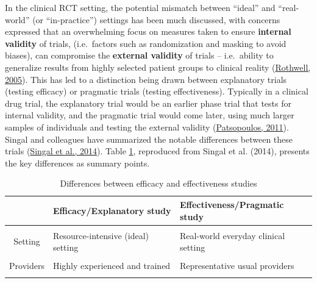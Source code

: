 \documentclass{krantz}
\begin{document}
In the clinical RCT setting, the potential mismatch between ``ideal'' and ``real-world'' (or ``in-practice'') settings has been much discussed, with concerns expressed that an overwhelming focus on measures taken to ensure \textbf{internal validity} of trials, (i.e.~factors such as randomization and masking to avoid biases), can compromise the \textbf{external validity} of trials -- i.e.~ability to generalize results from highly selected patient groups to clinical reality (\protect\hyperlink{ref-rothwell2005}{Rothwell, 2005}). This has led to a distinction being drawn between explanatory trials (testing efficacy) or pragmatic trials (testing effectiveness). Typically in a clinical drug trial, the explanatory trial would be an earlier phase trial that tests for internal validity, and the pragmatic trial would come later, using much larger samples of individuals and testing the external validity (\protect\hyperlink{ref-patsopoulos2011}{Patsopoulos, 2011}). Singal and colleagues have summarized the notable differences between these trials (\protect\hyperlink{ref-singal2014}{Singal et al., 2014}). Table \ref{tab:diffeff}, reproduced from Singal et al. (2014), presents the key differences as summary points.

\begin{table}

\caption{\label{tab:diffeff}Differences between efficacy and effectiveness studies}
\centering
\begin{tabular}[t]{c>{\centering\arraybackslash}p{13em}>{\centering\arraybackslash}p{13em}}
\toprule
  & Efficacy/Explanatory study & Effectiveness/Pragmatic study\\
\midrule
\cellcolor{gray!6}{Question} & \cellcolor{gray!6}{Does the intervention work under ideal circumstances?} & \cellcolor{gray!6}{Does the intervention work in real-world practice?}\\
Setting & Resource-intensive (ideal) setting & Real-world everyday clinical setting\\
\cellcolor{gray!6}{Study population} & \cellcolor{gray!6}{Highly selected, homogenous population (Several exclusion criteria)} & \cellcolor{gray!6}{Heterogeneous population (Few to no exclusion criteria)}\\
Providers & Highly experienced and trained & Representative usual providers\\
\cellcolor{gray!6}{Intervention} & \cellcolor{gray!6}{Strictly enforced and standardized. No concurrent interventions} & \cellcolor{gray!6}{Applied with flexibility. Concurrent interventions and cross-over permitted}\\
\bottomrule
\end{tabular}
\end{table}
\end{document}
